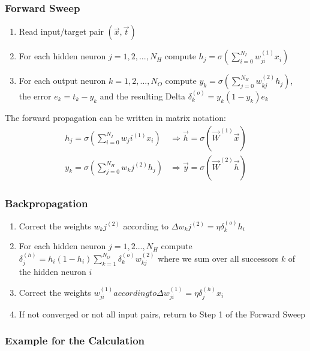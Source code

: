 \documentclass[11pt]{article}
\begin{document}
\subsubsection{Forward Sweep}

\begin{enumerate}
    \item Read input/target pair $(\vec{x},\vec{t})$
    \item For each hidden neuron $j = 1,2,...,N_H$ compute $h_j=\sigma\left(\sum_{i=0}^{N_I} w_{ji}^{(1)} x_i \right)$
    \item For each output neuron $k = 1,2,...,N_O$ compute $y_k=\sigma\left(\sum_{j=0}^{N_H} w_{kj}^{(2)} h_j \right)$, the error $e_k = t_k - y_k$ and the resulting Delta $\delta_k^{(o)} = y_k(1-y_k)e_k$
\end{enumerate}

\noindent
The forward propagation can be written in matrix notation:
\begin{align*}
    h_j=\sigma\left(\sum_{i=0}^{N_I} w_ji^{(1)} x_i \right) &\Rightarrow \vec{h} = \sigma\left( \vec{W}^{(1)} \vec{x} \right)\\
    y_k=\sigma\left(\sum_{j=0}^{N_H} w_kj^{(2)} h_j \right) &\Rightarrow \vec{y} = \sigma\left( \vec{W}^{(2)} \vec{h} \right)
\end{align*}

\subsubsection{Backpropagation}

\begin{enumerate}
    \item Correct the weights $w_kj^{(2)}$ according to $\Delta w_kj^{(2)} = \eta \delta_k^{(o)} h_i$
    \item For each hidden neuron $j = 1,2...,N_H$ compute $\delta_j^{(h)} = h_i(1-h_i)\sum_{k=1}^{N_O} \delta_k^{(o)} w_{kj}^{(2)}$ where we sum over all successors $k$ of the hidden neuron $i$
    \item Correct the weights $w_{ji}^{(1)} according to $$\Delta w_{ji}^{(1)} = \eta \delta_j^{(h)} x_i$
    \item If not converged or not all input pairs, return to Step 1 of the Forward Sweep
\end{enumerate}

\subsubsection{Example for the Calculation}
\end{document}
